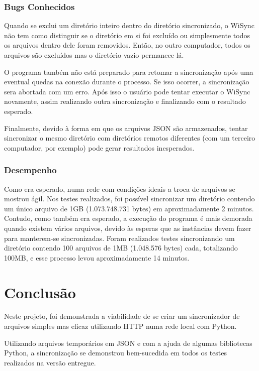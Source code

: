 \documentclass[12pt,a4paper]{ufpr}
\begin{document}
\subsection{Bugs Conhecidos}
Quando se exclui um diretório inteiro dentro do diretório sincronizado, o WiSync não tem como distinguir se o diretório em si foi excluído ou simplesmente todos os arquivos dentro dele foram removidos.
Então, no outro computador, todos os arquivos são excluídos mas o diretório vazio permanece lá.

O programa também não está preparado para retomar a sincronização após uma eventual quedas na conexão durante o processo.
Se isso ocorrer, a sincronização sera abortada com um erro.
Após isso o usuário pode tentar executar o WiSync novamente, assim realizando outra sincronização e finalizando com o resultado esperado.

Finalmente, devido à forma em que os arquivos JSON são armazenados, tentar sincronizar o mesmo diretório com diretórios remotos diferentes (com um terceiro computador, por exemplo) pode gerar resultados inesperados.

\subsection{Desempenho}

Como era esperado, numa rede com condições ideais a troca de arquivos se mostrou ágil.
Nos testes realizados, foi possível sincronizar um diretório contendo um único arquivo de 1GB (1.073.748.731 bytes) em aproximadamente 2 minutos.
Contudo, como também era esperado, a execução do programa é mais demorada quando existem vários arquivos, devido às esperas que as instâncias devem fazer para manterem-se sincronizadas.
Foram realizados testes sincronizando um diretório contendo 100 arquivos de 1MB (1.048.576 bytes) cada, totalizando 100MB, e esse processo levou aproximadamente 14 minutos.


\chapter{Conclusão}
\label{conclusao}

Neste projeto, foi demonstrada a viabilidade de se criar um sincronizador de arquivos simples mas eficaz utilizando HTTP numa rede local com Python.

Utilizando arquivos temporários em JSON e com a ajuda de algumas bibliotecas Python, a sincronização se demonstrou bem-sucedida em todos os testes realizados na versão entregue.
\end{document}
